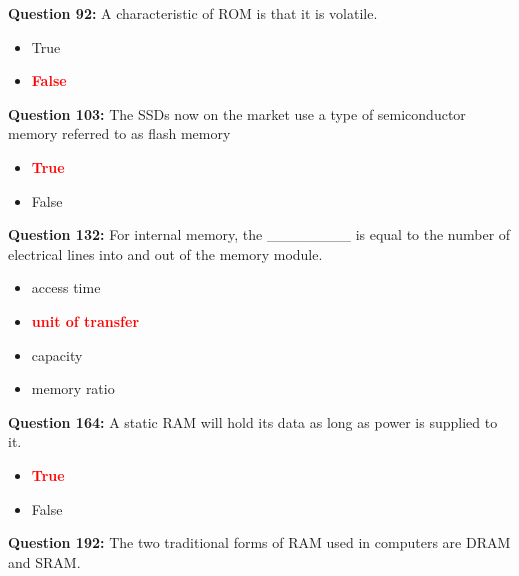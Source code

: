 \documentclass[12pt,a4paper]{article}
\begin{document}
\vspace{0.5cm}

\textbf{Question 92:} A characteristic of ROM is that it is volatile.

\begin{itemize}
    \item[\textbf{A.}] True
    \item[\textbf{B.}] \textcolor{red}{\textbf{False}}
\end{itemize}

\vspace{0.5cm}

\textbf{Question 103:} The SSDs now on the market use a type of semiconductor memory referred to as flash memory

\begin{itemize}
    \item[\textbf{A.}] \textcolor{red}{\textbf{True}}
    \item[\textbf{B.}] False
\end{itemize}

\vspace{0.5cm}

\textbf{Question 132:} For internal memory, the ________ is equal to the number of electrical lines into and out of the memory module.

\begin{itemize}
    \item[\textbf{A.}] access time
    \item[\textbf{B.}] \textcolor{red}{\textbf{unit of transfer}}
    \item[\textbf{C.}] capacity
    \item[\textbf{D.}] memory ratio
\end{itemize}

\vspace{0.5cm}

\textbf{Question 164:} A static RAM will hold its data as long as power is supplied to it.

\begin{itemize}
    \item[\textbf{A.}] \textcolor{red}{\textbf{True}}
    \item[\textbf{B.}] False
\end{itemize}

\vspace{0.5cm}

\textbf{Question 192:} The two traditional forms of RAM used in computers are DRAM and SRAM.
\end{document}
